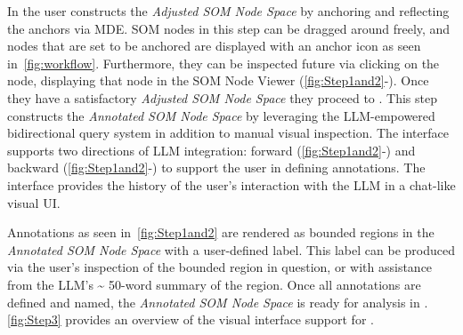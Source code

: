 %
%
In  the user constructs the \textit{Adjusted SOM Node Space} by anchoring and reflecting the anchors via MDE. 
%
SOM nodes in this step can be dragged around freely, and nodes that are set to be anchored are displayed with an anchor icon as seen in~\cref{fig:workflow}.
%
Furthermore, they can be inspected future via clicking on the node, displaying that node in the SOM Node Viewer (\cref{fig:Step1and2}-).
%
Once they have a satisfactory \textit{Adjusted SOM Node Space} they proceed to .
%
This step constructs the \textit{Annotated SOM Node Space} by leveraging the LLM-empowered bidirectional query system in addition to manual visual inspection.
%
The interface supports two directions of LLM integration: forward (\cref{fig:Step1and2}-) and backward (\cref{fig:Step1and2}-) to support the user in defining annotations.
%
The interface provides the history of the user's interaction with the LLM in a chat-like visual UI.

Annotations as seen in~\cref{fig:Step1and2} are rendered as bounded regions in the \textit{Annotated SOM Node Space} with a user-defined label.
%
This label can be produced via the user's inspection of the bounded region in question, or with assistance from the LLM's \textasciitilde
 50-word summary of the region.
%
Once all annotations are defined and named, the \textit{Annotated SOM Node Space} is ready for analysis in .
%
\cref{fig:Step3} provides an overview of the visual interface support for .
%
